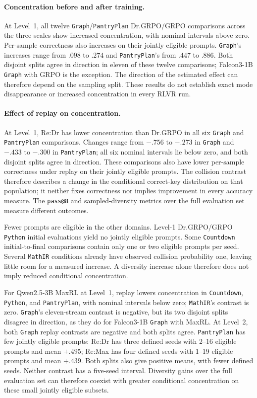 \paragraph{Concentration before and after training.}
At Level~1, all twelve \texttt{Graph}/\texttt{PantryPlan} Dr.GRPO/GRPO comparisons across the
three scales show increased concentration, with nominal intervals above
zero. Per-sample correctness also increases on their jointly eligible
prompts. \texttt{Graph}'s increases range from $.098$ to $.274$ and \texttt{PantryPlan}'s
from $.447$ to $.886$. Both disjoint splits agree in direction in eleven
of these twelve comparisons; Falcon3-1B \texttt{Graph} with GRPO is the
exception. The direction of the estimated effect can therefore depend on
the sampling split. These results do not establish exact mode disappearance
or increased concentration in every RLVR run.

\paragraph{Effect of replay on concentration.}
At Level~1, Re:Dr has lower concentration than Dr.GRPO in all six \texttt{Graph}
and \texttt{PantryPlan} comparisons. Changes range from $-.756$ to $-.273$ in
\texttt{Graph} and $-.433$ to $-.300$ in \texttt{PantryPlan}; all six nominal intervals lie
below zero, and both disjoint splits agree in direction. These
comparisons also have lower per-sample correctness under replay on their
jointly eligible prompts. The collision contrast therefore describes a
change in the conditional correct-key distribution on that population;
it neither fixes correctness nor implies improvement in every accuracy
measure. The \texttt{pass@8} and sampled-diversity metrics over the full evaluation
set measure different outcomes.

Fewer prompts are eligible in the other domains. Level-1
Dr.GRPO/GRPO \texttt{Python} initial evaluations yield no jointly eligible prompts.
Some \texttt{Countdown} initial-to-final comparisons contain only one or two eligible
prompts per seed. Several \texttt{MathIR} conditions already have observed
collision probability one, leaving little room for a measured increase. A diversity increase
alone therefore does not imply reduced conditional concentration.

For Qwen2.5-3B MaxRL at Level~1, replay lowers concentration in \texttt{Countdown},
\texttt{Python}, and \texttt{PantryPlan}, with nominal intervals below zero; \texttt{MathIR}'s
contrast is zero. \texttt{Graph}'s eleven-stream contrast is negative, but its two
disjoint splits disagree in direction, as they do for Falcon3-1B \texttt{Graph} with
MaxRL. At Level~2, both \texttt{Graph} replay contrasts are negative and both
splits agree. \texttt{PantryPlan} has few jointly eligible prompts: Re:Dr has three defined seeds with 2--16 eligible prompts
and mean $+.495$; Re:Max has four defined seeds with 1--19 eligible
prompts and mean $+.439$. Both splits also give positive means, with
fewer defined seeds. Neither contrast has a five-seed interval.
Diversity gains over the full evaluation set can therefore coexist with
greater conditional concentration on these small jointly eligible subsets.

